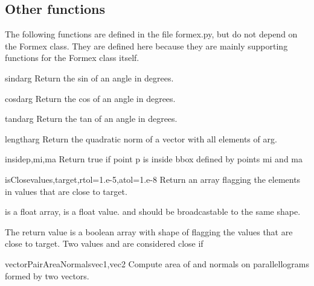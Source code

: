 {{\subsection{Other functions}
The following functions are defined in the file formex.py, but do not depend on the Formex class. They are defined here because they are mainly supporting functions for the Formex class itself.


\begin{funcdesc}{sind}{arg}
    Return the sin of an angle in degrees.
\end{funcdesc}

\begin{funcdesc}{cosd}{arg}
    Return the cos of an angle in degrees.
\end{funcdesc}

\begin{funcdesc}{tand}{arg}
    Return the tan of an angle in degrees.
\end{funcdesc}

\begin{funcdesc}{length}{arg}
    Return the quadratic norm of a vector with all elements of arg.
\end{funcdesc}

\begin{funcdesc}{inside}{p,mi,ma}
    Return true if point p is inside bbox defined by points mi and ma
\end{funcdesc}


\begin{funcdesc}{isClose}{values,target,rtol=1.e-5,atol=1.e-8}
Return an array flagging the elements in values that are close to target.

 is a float array,  is a float value.
 and  should be broadcastable to the same shape.
    
The return value is a boolean array with shape of  flagging
the values that are close to target.
Two values  and   are considered close if 
\end{funcdesc}

\begin{funcdesc}{vectorPairAreaNormals}{vec1,vec2}
Compute area of and normals on parallellograms formed by two vectors.


\end{funcdesc}}}

